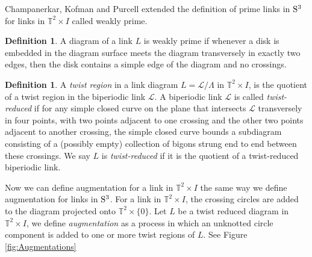 \documentclass[11pt]{amsart}
\newcommand{\Sp}{{\rm{S}}}
\newcommand{\torus}{{\mathbb{T}^2}}
\theoremstyle{plain}
\theoremstyle{definition}
\newtheorem{define}[theorem]{Definition}
\begin{document}
Champanerkar, Kofman and Purcell \cite{CKP2} extended the definition of prime links in $\Sp^3$ for links in $\torus \times I$ called weakly prime. 

 \begin{define} \label{def:weaklyprime}
A diagram of a link $L$ is weakly prime if whenever a disk is embedded in the diagram surface meets the diagram transversely in exactly two edges, then the disk contains a simple edge of the diagram and no crossings.
\end{define}


\begin{define}
A \emph{twist region} in a link diagram $L=\mathcal{L}/\Lambda$ in $\torus \times I$, is the quotient of a twist region in the biperiodic link $\mathcal{L}$. %
A biperiodic link $\mathcal{L}$ is called \emph{twist-reduced} if for any simple closed curve on the plane that intersects $\mathcal{L}$ transversely in four points, with two points adjacent to one crossing and the other two points adjacent to another crossing, the simple closed
curve bounds a subdiagram consisting of a (possibly empty) collection of bigons
strung end to end between these crossings. We say $L$ is \emph{twist-reduced} if it is the quotient of a twist-reduced biperiodic link. 
\end{define}

Now we can define augmentation for a link in $\torus \times I$ the same way we define augmentation for links in $\Sp^3$. For a link in $\torus \times I$, the crossing circles are added to the diagram projected onto $\torus \times \{0\}$. Let $L$ be a twist reduced diagram in $\torus \times I$, we define {\it augmentation} as a process in which an unknotted circle component is added to one or more twist regions of $L$. See Figure \ref{fig:Augmentations}
\end{document}
